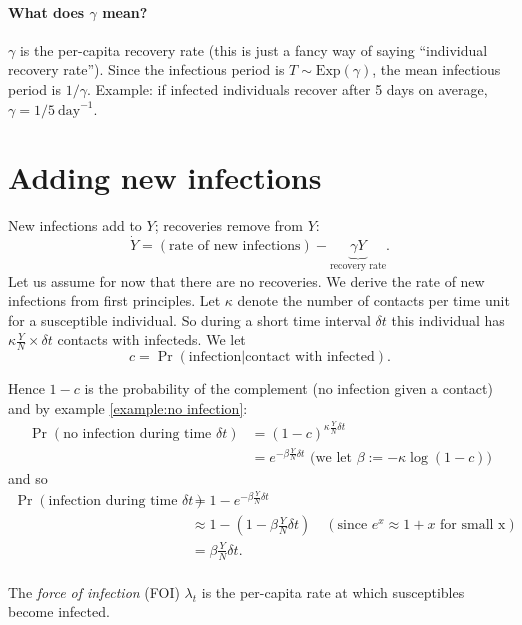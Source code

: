 \paragraph{What does $\gamma$ mean?}
$\gamma$ is the per-capita recovery rate (this is just a fancy way of
saying ``individual recovery rate''). Since the infectious period is
$T\sim\text{Exp}(\gamma)$, the mean infectious period is
$1/\gamma$. Example: if infected individuals recover after 5 days on
average, $\gamma = 1/5\ \text{day}^{-1}$.

\section{Adding new infections}

New infections add to $Y$; recoveries remove from $Y$:
\[
\dot Y = (\text{rate of new infections}) - \underbrace{\gamma Y}_{\text{recovery rate}}.
\]
Let us assume for now that there are no recoveries. We derive the rate
of new infections from first principles. Let $\kappa$ denote the
number of contacts per time unit for a susceptible individual. So
during a short time interval $\delta t$ this individual has $\kappa
\frac{Y}{N} \times \delta t$ contacts with infecteds. We let
\[
c = \Pr(\text{infection}|\text{contact with infected}).
\]

Hence $1-c$ is the probability of the complement (no infection given a
contact) and by example \ref{example:no infection}:
\begin{align*}
  \Pr(\text{no infection during time $\delta t$}) &= (1-c)^{\kappa \frac{Y}{N} \delta t} \\
  &= e^{-\beta \frac{Y}{N} \delta t} \text{ (we let $\beta:= -\kappa \log(1-c)$)} 
\end{align*}
and so
\begin{align*}
  \Pr(\text{infection during time $\delta t$})
  &= 1 - e^{-\beta \frac{Y}{N} \delta t}\\
  &\approx 1 - (1-\beta \frac{Y}{N} \delta t) \quad  (\text{since $e^x \approx 1+x$ for small x})\\
  &= \beta \frac{Y}{N} \delta t.  \\
\end{align*}

\begin{definition}
The \emph{force of infection} (FOI) $\lambda_t$ is the per-capita
rate at which susceptibles become infected.
\end{definition}

